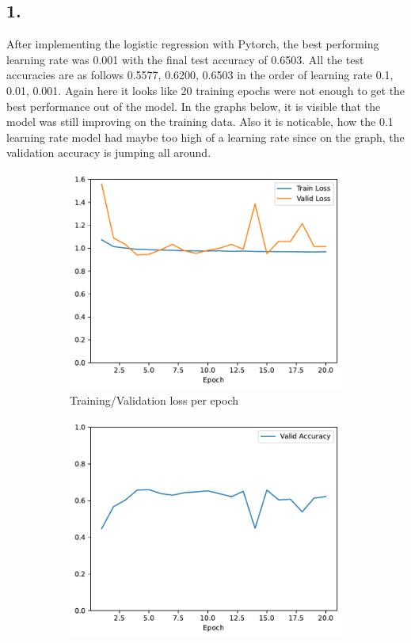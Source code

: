 \documentclass[11pt]{article}
\begin{document}
\subsection{1.}
After implementing the logistic regression with Pytorch, the best performing learning rate was 0.001 with the final test accuracy of 0.6503.
All the test accuracies are as follows 0.5577, 0.6200, 0.6503 in the order of learning rate 0.1, 0.01, 0.001.
Again here it looks like 20 training epochs were not enough to get the best performance out of the model.
In the graphs below, it is visible that the model was still improving on the training data.
Also it is noticable, how the 0.1 learning rate model had maybe too high of a learning rate since on the graph, the validation accuracy is jumping all around.
\begin{figure}
\centering
\begin{subfigure}{.5\textwidth}
  \centering
  \includegraphics[width=.9\linewidth]{plots/logistic_regression-training-loss-batch-16-lr-0.1-epochs-20-l2-0-opt-sgd}
  \caption{Training/Validation loss per epoch}
\end{subfigure}%
\begin{subfigure}{.5\textwidth}
  \centering
  \includegraphics[width=.9\linewidth]{plots/logistic_regression-validation-accuracy-batch-16-lr-0.1-epochs-20-l2-0-opt-sgd}

\end{subfigure}
\end{figure}
\end{document}
